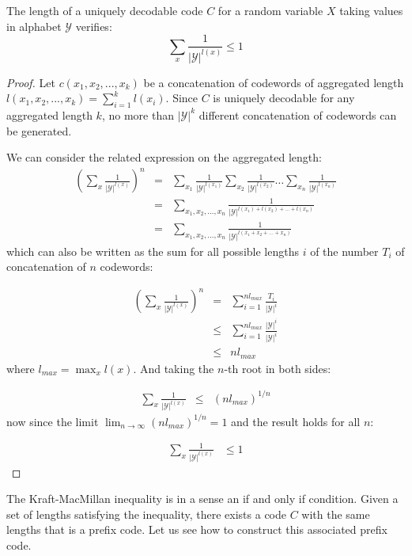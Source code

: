 \begin{theorem} \label{th:mcmillan}
The length of a uniquely decodable code $C$ for a random variable ${X}$ taking values in alphabet $\mathcal{Y}$ verifies:
\begin{equation*}
\sum_{x}\frac{1}{|\mathcal{Y}|^{l(x)}} \leq 1
\end{equation*}
\end{theorem}
\begin{proof}
Let $c(x_1, x_2, ..., x_k)$ be a concatenation of codewords of aggregated length $l(x_1, x_2, ..., x_k)=\sum_{i=1}^k l(x_i)$. Since $C$ is uniquely decodable for any aggregated length $k$, no more than $|\mathcal{Y}|^k$ different concatenation of codewords can be generated. 

We can consider the related expression on the aggregated length:
\begin{eqnarray}
\left( \sum_{x}\frac{1}{|\mathcal{Y}|^{l(x)}} \right)^n &=& \sum_{x_1}\frac{1}{|\mathcal{Y}|^{l(x_1)}} \sum_{x_2}\frac{1}{|\mathcal{Y}|^{l(x_2)}} \dots \sum_{x_n }\frac{1}{|\mathcal{Y}|^{l(x_n)}} \nonumber \\
&=& \sum_{x_1,x_2,\dots,x_n }\frac{1}{|\mathcal{Y}|^{l(x_1)+l(x_2)+\dots +l(x_n)}} \nonumber \\
&=& \sum_{x_1,x_2,\dots,x_n }\frac{1}{|\mathcal{Y}|^{l(x_1+x_2+\dots +x_n)}}
\end{eqnarray}
\noindent which can also be written as the sum for all possible lengths $i$ of the number $T_i$ of concatenation of $n$ codewords:

\begin{eqnarray}
\left( \sum_{x }\frac{1}{|\mathcal{Y}|^{l(x)}} \right)^n &=& \sum_{i=1}^{nl_{max}}\frac{T_i}{|\mathcal{Y}|^i} \nonumber \\
&\leq & \sum_{i=1}^{nl_{max}}\frac{|\mathcal{Y}|^i}{|\mathcal{Y}|^i} \nonumber \\
&\leq & nl_{max}
\end{eqnarray}
\noindent where $l_{max} = \max_{x}l(x)$. And taking the $n$-th root in both sides:

\begin{eqnarray}
\sum_{x }\frac{1}{|\mathcal{Y}|^{l(x)}}  &\leq & (nl_{max})^{1/n}
\end{eqnarray}
\noindent now since the limit $\lim_{n \to \infty } (nl_{max})^{1/n} = 1$ and the result holds for all $n$:

\begin{eqnarray}
\sum_{x }\frac{1}{|\mathcal{Y}|^{l(x)}}  &\leq 1
\end{eqnarray}
\end{proof}
The Kraft-MacMillan inequality is in a sense an if and only if condition. Given a set of lengths satisfying the inequality, there exists a code $C$ with the same lengths that is a prefix code.  
Let us see how to construct this associated prefix code. 

